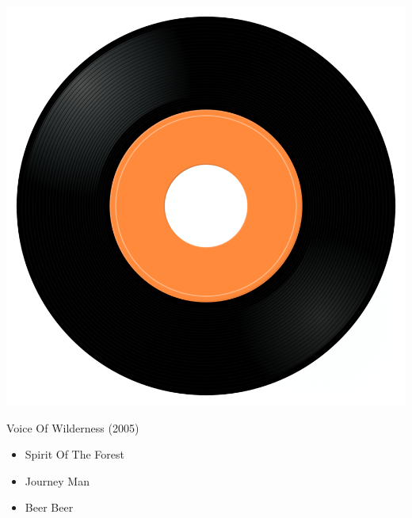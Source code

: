 \begin{minipage}[t]{0.25\textwidth}
\captionsetup{type=figure}
\includegraphics[width=\textwidth]{Images/cover.png}
\caption*{Voice Of Wilderness (2005)}
\end{minipage}
\begin{minipage}[t]{0.25\textwidth}\vspace{0pt}
\begin{itemize}[nosep,leftmargin=1em,labelwidth=*,align=left]
	\setlength{\itemsep}{0pt}
	\item Spirit Of The Forest
	\item Journey Man
	\item Beer Beer
\end{itemize}
\end{minipage}
